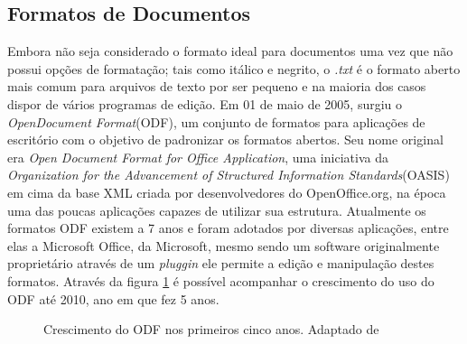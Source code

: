 \subsection{Formatos de Documentos}
Embora não seja considerado o formato ideal para documentos uma vez que não possui opções de formatação; tais como itálico e negrito, o \textit{.txt} é o formato aberto mais comum para arquivos de texto por ser pequeno e na maioria dos casos dispor de vários programas de edição.
Em 01 de maio de 2005, surgiu o \textit{OpenDocument Format}(ODF), um conjunto de formatos para aplicações de escritório com o objetivo de padronizar os formatos abertos. Seu nome original era \textit{Open Document Format for Office Application}, uma iniciativa da \textit{Organization for the Advancement of Structured Information Standards}(OASIS) em cima da base XML criada por desenvolvedores do OpenOffice.org, na época uma das poucas aplicações capazes de utilizar sua estrutura.
Atualmente os formatos ODF existem a 7 anos e foram adotados por diversas aplicações, entre elas a Microsoft Office, da Microsoft, mesmo sendo um software originalmente proprietário através de um \textit{pluggin} ele permite a edição e manipulação destes formatos.
Através da figura \ref{crescimento_odf} é possível acompanhar o crescimento do uso do ODF até 2010, ano em que fez 5 anos.
\begin{figure}[ht]
    \centering
    \caption{Crescimento do ODF nos primeiros cinco anos. Adaptado de \cite{Silva 2010 OpenOffice}}
    \label{crescimento_odf}
\end{figure}
